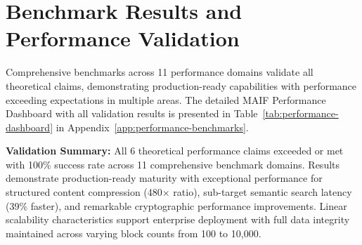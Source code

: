 \documentclass[conference]{IEEEtran}
\begin{document}





\section{Benchmark Results and Performance Validation}
\label{sec:benchmark-results}
Comprehensive benchmarks across 11 performance domains validate all theoretical claims, demonstrating production-ready capabilities with performance exceeding expectations in multiple areas. The detailed MAIF Performance Dashboard with all validation results is presented in Table~\ref{tab:performance-dashboard} in Appendix~\ref{app:performance-benchmarks}.

\textbf{Validation Summary:} All 6 theoretical performance claims exceeded or met with 100\% success rate across 11 comprehensive benchmark domains. Results demonstrate production-ready maturity with exceptional performance for structured content compression (480$\times$ ratio), sub-target semantic search latency (39\% faster), and remarkable cryptographic performance improvements. Linear scalability characteristics support enterprise deployment with full data integrity maintained across varying block counts from 100 to 10,000.


\end{document}
